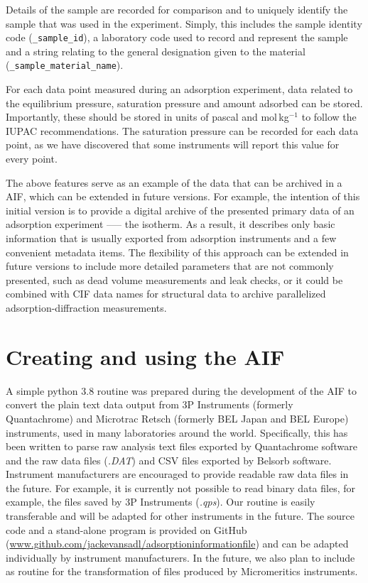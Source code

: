 \documentclass[journal=langd5,manuscript=article]{achemso}
\begin{document}
Details of the sample are recorded for comparison and to uniquely identify the sample that was used in the experiment.
Simply, this includes the sample identity code (\texttt{\_sample\_id}), a laboratory code used to record and represent the sample and a string relating to the general designation given to the material (\texttt{\_sample\_material\_name}).

For each data point measured during an adsorption experiment, data related to the equilibrium pressure, saturation pressure and amount adsorbed can be stored. Importantly, these should be stored in units of pascal and mol$\,$kg$^{-1}$ to follow the IUPAC recommendations.\cite{10.1515/pac-2014-1117}
The saturation pressure can be recorded for each data point, as we have discovered that some instruments will  report this value for every point.

The above features serve as an example of the data that can be archived in a AIF, which can be extended in future versions.
For example, the intention of this initial version is to provide a digital archive of the presented primary data of an adsorption experiment ––– the isotherm.
As a result, it describes only basic information that is usually exported from adsorption instruments and a few convenient metadata items.
The flexibility of this approach can be extended in future versions to include more detailed parameters that are not commonly presented, such as dead volume measurements and leak checks, or it could be combined with CIF data names for structural data to archive parallelized adsorption-diffraction measurements.

\section{Creating and using the AIF}
A simple python 3.8 routine was prepared during the development of the AIF to convert the plain text data output from 3P Instruments (formerly Quantachrome) and Microtrac Retsch (formerly BEL Japan and BEL Europe) instruments, used in many laboratories around the world.
Specifically, this has been written to parse raw analysis text files exported by Quantachrome software and the raw data files (\textit{.DAT}) and CSV files exported by Belsorb software.
Instrument manufacturers are encouraged to provide readable raw data files in the future.
For example, it is currently not possible to read binary data files, for example, the files saved by 3P Instruments (\textit{.qps}).
Our routine is easily transferable and will be adapted for other instruments in the future.
The source code and a stand-alone program is provided on GitHub (\url{www.github.com/jackevansadl/adsorptioninformationfile}) and can be adapted individually by instrument manufacturers.
In the future, we also plan to include as routine for the transformation of files produced by Micromeritics instruments.
\end{document}
